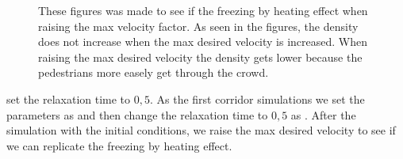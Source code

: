 \begin{figure}
\centering
{}
\caption{These figures was made to see if the freezing by heating effect when raising the max velocity factor. As seen in the figures, the
density does not increase when the max desired velocity is increased. When raising the max desired velocity the density gets lower because
the pedestrians more easely get through the crowd.}
\label{fig:freezingbyheating}
\end{figure}

\cite{helbing00} set the relaxation time to $0,5$. As the first corridor simulations we set the parameters as \cite{ABconstant}
and then change the relaxation time to $0,5$ as \cite{helbing00}. After the simulation with the initial conditions, we raise the
max desired velocity to see if we can replicate the freezing by heating effect.

